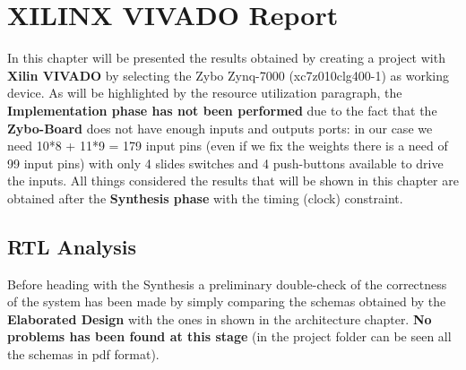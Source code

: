 \section{XILINX VIVADO Report}
In this chapter will be presented the results obtained by creating a project with \textbf{Xilin VIVADO} by selecting the Zybo Zynq-7000 (xc7z010clg400-1) as working device. As will be highlighted by the resource utilization paragraph, the \textbf{Implementation phase has not been performed} due to the fact that the \textbf{Zybo-Board} does not have enough inputs and outputs ports: in our case we need 10*8 + 11*9 = 179 input pins (even if we fix the weights there is a need of 99 input pins) with only 4 slides switches and 4 push-buttons available to drive the inputs. All things considered the results that will be shown in this chapter are obtained after the \textbf{Synthesis phase} with the timing (clock) constraint.

\subsection{RTL Analysis}
Before heading with the Synthesis a preliminary double-check of the correctness of the system has been made by simply comparing the schemas obtained by the \textbf{Elaborated Design} with the ones in shown in the architecture chapter.\textbf{ No problems has been found at this stage} (in the project folder can be seen all the schemas in pdf format).
